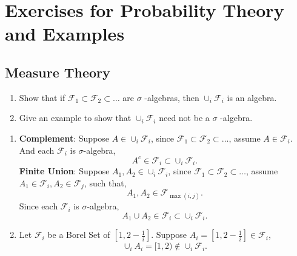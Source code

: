 \chapter{Exercises for Probability Theory and Examples}

\section{Measure Theory}

\begin{exercise}
    \begin{enumerate}
        \item Show that if $\mathcal{F}_{1}\subset \mathcal{F}_{2}\subset\ldots$ are $\sigma$ -algebras, then $\cup_{i}\mathcal{F}_{i}$ is an algebra.
        \item Give an example to show that $\cup_{i}\mathcal{F}_{i}$ need not be a $\sigma$ -algebra.
    \end{enumerate}
\end{exercise}

\begin{solution}
    \begin{enumerate}
        \item
        \textbf{Complement}: Suppose $A\in\cup_{i}\mathcal{F}_{i}$, since $\mathcal{F}_{1}\subset \mathcal{F}_{2}\subset\ldots$, assume $A\in\mathcal{F}_{i}$. And each $\mathcal{F}_{i}$ is $\sigma$-algebra,
        \begin{equation*}
            A^c\in\mathcal{F}_{i}\subset\cup_{i}\mathcal{F}_{i}.
        \end{equation*}
        \textbf{Finite Union}: Suppose $A_1,A_2\in\cup_{i}\mathcal{F}_{i}$, since $\mathcal{F}_{1}\subset \mathcal{F}_{2}\subset\ldots$, assume $A_1\in\mathcal{F}_{i},A_2\in\mathcal{F}_{j}$, such that,
        \begin{equation*}
            A_1,A_2\in\mathcal{F}_{\max(i,j)}.
        \end{equation*}
        Since each $\mathcal{F}_{i}$ is $\sigma$-algebra,
        \begin{equation*}
            A_1\cup A_2\in\mathcal{F}_{i}\subset\cup_{i}\mathcal{F}_{i}.
        \end{equation*}
        \item
        Let $\mathcal{F}_{i}$ be a Borel Set of $[1,2-\frac{1}{i}]$. Suppose $A_i=[1,2-\frac{1}{i}]\in\mathcal{F}_{i}$,
        \begin{equation*}
            \cup_{i}A_{i}=[1,2)\notin\cup_{i}\mathcal{F}_{i}.
        \end{equation*}
    \end{enumerate}
\end{solution}

